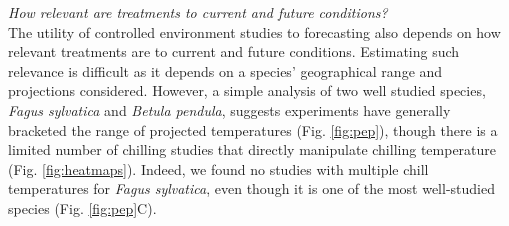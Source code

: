 \documentclass[11pt,letter]{article}
\begin{document}

\emph{How relevant are treatments to current and future conditions?}\\
The utility of controlled environment studies to forecasting also depends on how relevant treatments are to current and future conditions. Estimating such relevance is difficult as it depends on a species' geographical range and projections considered. However, a simple analysis of two well studied species, \emph{Fagus sylvatica} and \emph{Betula pendula}, suggests experiments have generally bracketed the range of projected temperatures (Fig. \ref{fig:pep}), though there is a limited number of chilling studies that directly manipulate chilling temperature (Fig. \ref{fig:heatmaps}). Indeed, we found no studies with multiple chill temperatures for \emph{Fagus sylvatica}, even though it is one of the most well-studied species (Fig. \ref{fig:pep}C). \\ %
\end{document}
